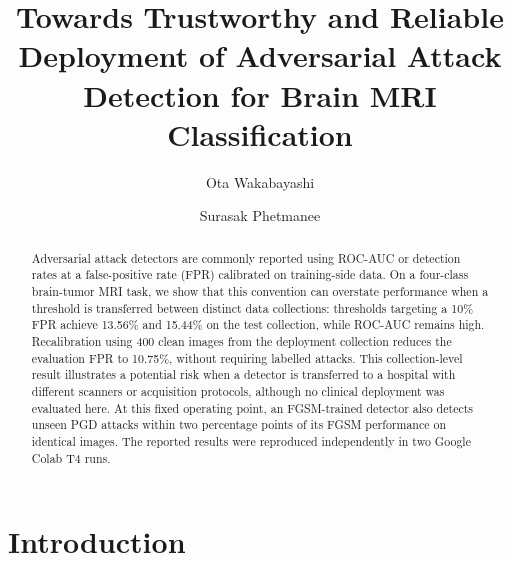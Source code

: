 \documentclass[runningheads]{llncs}
\begin{document}
\title{Towards Trustworthy and Reliable Deployment of Adversarial Attack Detection for Brain MRI Classification}

\author{Ota Wakabayashi \and Surasak Phetmanee}

\maketitle

\begin{abstract}
Adversarial attack detectors are commonly reported using ROC-AUC or
detection rates at a false-positive rate (FPR) calibrated on
training-side data. On a four-class brain-tumor MRI task, we show that
this convention can overstate performance when a threshold is transferred
between distinct data collections: thresholds targeting a 10\% FPR
achieve 13.56\% and 15.44\% on the test collection, while
ROC-AUC remains high. Recalibration using 400 clean images from the
deployment collection reduces the evaluation FPR to 10.75\%, without
requiring labelled attacks. This collection-level result illustrates a
potential risk when a detector is transferred to a hospital with
different scanners or acquisition protocols, although no clinical
deployment was evaluated here. At this fixed operating point, an
FGSM-trained detector also detects unseen PGD attacks within two
percentage points of its FGSM performance on identical images. The
reported results were reproduced independently in two Google Colab T4
runs.

\end{abstract}

\section{Introduction}
\end{document}
